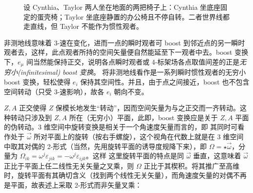 \begin{figure}[ht]\centering
    \caption{\small 设 Cynthia、Taylor 两人坐在地面的两把椅子上：Cynthia 坐底座固定的蛋壳椅；Taylor 坐底座静置的办公椅且不停自转。二者世界线都走直线，但 Taylor 不能作为惯性观者。}
\end{figure}


非测地线意味着 3-速在变化，进而一点的瞬时观者可 boost 到邻近点的另一瞬时观者去，这样，此点观者所持的空间矢量便自然能延至下一观者中去。boost 变换下，$e_\mu$ 间当然能保持正交，说明各点瞬时观者或 4-标架场各点取值间差的正是\textit{无穷小(infinitesimal) boost 变换}。
将非测地线看作是一系列瞬时惯性观者的无穷小 boost 变换，轻松使得 $e_i$ 保持其空间性。并且，由于点之间接近，boost 也不包含空间转动（只受 3-速影响），故各 $e_i$ 朝向不变。

$Z,A$ 正交使得 $Z$ 保模长地发生“转动”，因而空间矢量为与之正交而一齐转动。这种转动只涉及到 $Z,A$ 所在（无穷小）平面，此即，boost 变换应是关于 $Z,A$ 平面的伪转动。3 维空间中旋转变换是相关于一个角速度矢量而言的，即
其同时可看作处于 $\vec\omega$ 所对平面上的旋转（按右手螺旋），这个视角在代数上就是在 3 维空间中取其对偶的 2-形式（当然，先用旋转平面的诱导度规降下来），即 $\Omega=\star\vec\omega$，分量为 $\Omega_{ik}=\omega^j\varepsilon_{jik}=-\omega^j\varepsilon_{ijk}$。这样
这里旋转平面的特点是同 $\vec\omega$ 垂直，这意味着 $\vec\omega$ 正比于平面上任二线性无关矢量之叉乘，则 $\Omega$ 正比于其楔积。将其推广至高维时，旋转平面有其确切含义（找到两个线性无关矢量），而角速度矢量的对偶不再是平面，故表述上采取 2-形式而非矢量叉乘：

